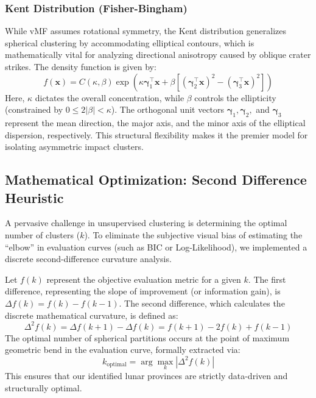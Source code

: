 \documentclass[12pt,a4paper]{report}
\begin{document}
\subsubsection{Kent Distribution (Fisher-Bingham)}
While vMF assumes rotational symmetry, the Kent distribution generalizes spherical clustering by accommodating elliptical contours, which is mathematically vital for analyzing directional anisotropy caused by oblique crater strikes. The density function is given by:
\begin{equation}
    f(\mathbf{x}) = C(\kappa, \beta) \exp \left( \kappa \boldsymbol{\gamma}_1^\top \mathbf{x} + \beta \left[ (\boldsymbol{\gamma}_2^\top \mathbf{x})^2 - (\boldsymbol{\gamma}_3^\top \mathbf{x})^2 \right] \right)
\end{equation}
Here, $\kappa$ dictates the overall concentration, while $\beta$ controls the ellipticity (constrained by $0 \le 2|\beta| < \kappa$). The orthogonal unit vectors $\boldsymbol{\gamma}_1, \boldsymbol{\gamma}_2,$ and $\boldsymbol{\gamma}_3$ represent the mean direction, the major axis, and the minor axis of the elliptical dispersion, respectively. This structural flexibility makes it the premier model for isolating asymmetric impact clusters.

\subsection{Mathematical Optimization: Second Difference Heuristic}
A pervasive challenge in unsupervised clustering is determining the optimal number of clusters ($k$). To eliminate the subjective visual bias of estimating the ``elbow'' in evaluation curves (such as BIC or Log-Likelihood), we implemented a discrete second-difference curvature analysis.

Let $f(k)$ represent the objective evaluation metric for a given $k$. The first difference, representing the slope of improvement (or information gain), is $\Delta f(k) = f(k) - f(k-1)$. The second difference, which calculates the discrete mathematical curvature, is defined as:
\begin{equation}
    \Delta^2 f(k) = \Delta f(k+1) - \Delta f(k) = f(k+1) - 2f(k) + f(k-1)
\end{equation}
The optimal number of spherical partitions occurs at the point of maximum geometric bend in the evaluation curve, formally extracted via:
\begin{equation}
    k_{\text{optimal}} = \arg\max_k |\Delta^2 f(k)|
\end{equation}
This ensures that our identified lunar provinces are strictly data-driven and structurally optimal.
\end{document}
